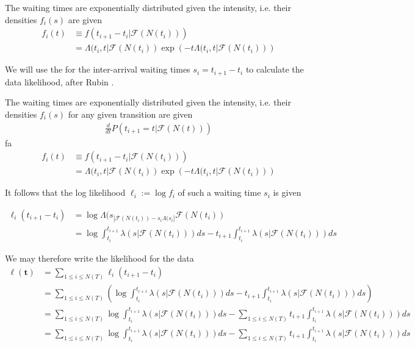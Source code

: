 \documentclass[11pt]{article}
\begin{document}
The waiting times are exponentially distributed given the intensity,
i.e. their densities \(f_i(s)\) are given \[\begin{aligned}
f_i(t)&\equiv f(t_{i+1}-t_i|\mathcal{F}(N(t_i)))\\
&=\Lambda(t_i,t|\mathcal{F}(N(t_i))\exp\left(-t\Lambda(t_i,t|\mathcal{F}(N(t_i))\right)
\end{aligned}\]

We will use the for the inter-arrival waiting times \(s_i=t_{i+1}-t_i\)
to calculate the data likelihood, after Rubin \cite{rubin_regular_1972}.

    The waiting times are exponentially distributed given the intensity,
i.e. their densities \(f_i(s)\) for any given transition are given
\[\begin{aligned}
\frac{d}{dt}P(t_{i+1}=t|\mathcal{F}(N(t)))
\end{aligned}\] fa \[\begin{aligned}
f_i(t)&\equiv f(t_{i+1}-t_i|\mathcal{F}(N(t_i)))\\
&=\Lambda(t_i,t|\mathcal{F}(N(t_i))\exp\left(-t\Lambda(t_i,t|\mathcal{F}(N(t_i))\right)
\end{aligned}\]

    It follows that the log likelihood \(\ell_i:=\log f_i\) of such a
waiting time \(s_i\) is given

\[\begin{aligned}
\ell_i(t_{i+1}-t_i) &=\log \Lambda(s_|\mathcal{F}(N(t_i)) - s_i \Lambda(s_i|\mathcal{F}(N(t_i))\\
&= \log \int_{t_i}^{t_{i+1}} \lambda(s|\mathcal{F}(N(t_i))) ds - {t_{i+1}} \int_{t_i}^{t_{i+1}} \lambda(s|\mathcal{F}(N(t_i))) ds
\end{aligned}
\]

    We may therefore write the likelihood for the data \[
\begin{aligned}
\ell(\mathbf{t}) &= \sum_{1\leq i\leq N(T)}\ell_i(t_{i+1}-t_i)\\
&= \sum_{1\leq i\leq N(T)} \left( \log \int_{t_i}^{t_{i+1}} \lambda(s|\mathcal{F}(N(t_i))) ds - {t_{i+1}} \int_{t_i}^{t_{i+1}} \lambda(s|\mathcal{F}(N(t_i))) ds\right)\\
&= \sum_{1\leq i\leq N(T)} \log \int_{t_i}^{t_{i+1}} \lambda(s|\mathcal{F}(N(t_i))) ds - \sum_{1\leq i\leq N(T)} {t_{i+1}} \int_{t_i}^{t_{i+1}} \lambda(s|\mathcal{F}(N(t_i))) ds\\
&= \sum_{1\leq i\leq N(T)} \log \int_{t_i}^{t_{i+1}} \lambda(s|\mathcal{F}(N(t_i))) ds - \sum_{1\leq i\leq N(T)} {t_{i+1}} \int_{t_i}^{t_{i+1}} \lambda(s|\mathcal{F}(N(t_i))) ds
\end{aligned}
\]
\end{document}
